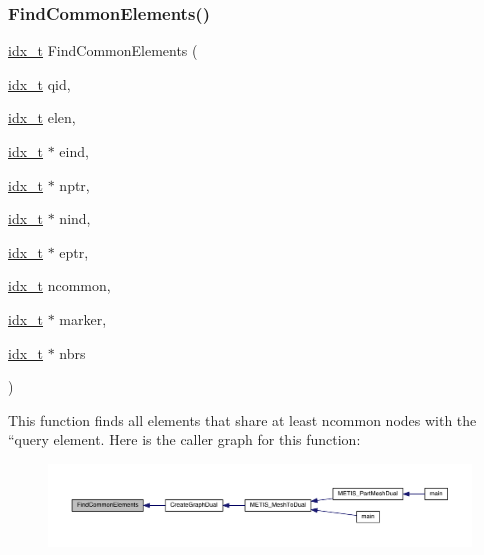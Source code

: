 \subsubsection{\texorpdfstring{Find\+Common\+Elements()}{FindCommonElements()}}
{\footnotesize\ttfamily \hyperlink{a00876_aaa5262be3e700770163401acb0150f52}{idx\+\_\+t} Find\+Common\+Elements (\begin{DoxyParamCaption}\item[{\hyperlink{a00876_aaa5262be3e700770163401acb0150f52}{idx\+\_\+t}}]{qid,  }\item[{\hyperlink{a00876_aaa5262be3e700770163401acb0150f52}{idx\+\_\+t}}]{elen,  }\item[{\hyperlink{a00876_aaa5262be3e700770163401acb0150f52}{idx\+\_\+t} $\ast$}]{eind,  }\item[{\hyperlink{a00876_aaa5262be3e700770163401acb0150f52}{idx\+\_\+t} $\ast$}]{nptr,  }\item[{\hyperlink{a00876_aaa5262be3e700770163401acb0150f52}{idx\+\_\+t} $\ast$}]{nind,  }\item[{\hyperlink{a00876_aaa5262be3e700770163401acb0150f52}{idx\+\_\+t} $\ast$}]{eptr,  }\item[{\hyperlink{a00876_aaa5262be3e700770163401acb0150f52}{idx\+\_\+t}}]{ncommon,  }\item[{\hyperlink{a00876_aaa5262be3e700770163401acb0150f52}{idx\+\_\+t} $\ast$}]{marker,  }\item[{\hyperlink{a00876_aaa5262be3e700770163401acb0150f52}{idx\+\_\+t} $\ast$}]{nbrs }\end{DoxyParamCaption})}

This function finds all elements that share at least ncommon nodes with the ``query\textquotesingle{}\textquotesingle{} element. Here is the caller graph for this function\+:\nopagebreak
\begin{figure}[H]
\begin{center}
\leavevmode
\includegraphics[width=350pt]{a00927_ab05bd1b0bb5bdaaf2e9dc8906675145c_icgraph}
\end{center}
\end{figure}
\mbox{\label{a00927_aa3fb3adf98a0168ead1ff715114ebea1}} 
